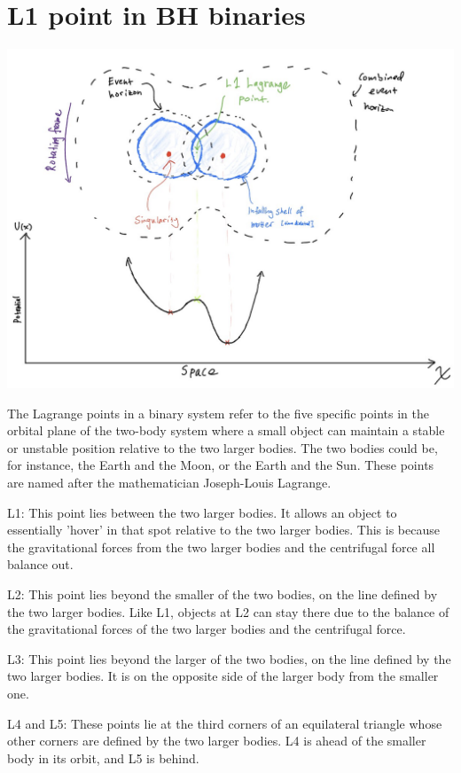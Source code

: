\section{L1 point in BH binaries}

\includegraphics[width=\textwidth]{preliminaries/preliminaries_images/L1_PE.jpeg}

The Lagrange points in a binary system refer to the five specific points in the orbital plane of the two-body system where a small object can maintain a stable or unstable position relative to the two larger bodies. The two bodies could be, for instance, the Earth and the Moon, or the Earth and the Sun. These points are named after the mathematician Joseph-Louis Lagrange.

L1: This point lies between the two larger bodies. It allows an object to essentially 'hover' in that spot relative to the two larger bodies. This is because the gravitational forces from the two larger bodies and the centrifugal force all balance out.

L2: This point lies beyond the smaller of the two bodies, on the line defined by the two larger bodies. Like L1, objects at L2 can stay there due to the balance of the gravitational forces of the two larger bodies and the centrifugal force.

L3: This point lies beyond the larger of the two bodies, on the line defined by the two larger bodies. It is on the opposite side of the larger body from the smaller one.

L4 and L5: These points lie at the third corners of an equilateral triangle whose other corners are defined by the two larger bodies. L4 is ahead of the smaller body in its orbit, and L5 is behind.

